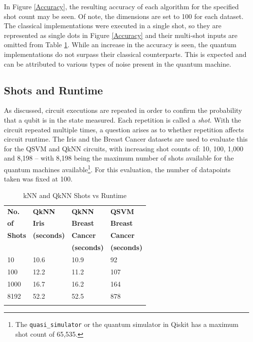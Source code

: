 In Figure \ref{Accuracy}, the resulting accuracy of each algorithm for the specified shot count may be seen. Of note, the dimensions are set to 100 for each dataset. The classical implementations were executed in a single shot, so they are represented as single dots in Figure \ref{Accuracy} and their multi-shot inputs are omitted from Table \ref{tab:treatments}. While an increase in the accuracy is seen, the quantum implementations do not surpass their classical counterparts. This is expected and can be attributed to various types of noise present in the quantum machine. 

\subsection{Shots and Runtime}
As discussed, circuit executions are repeated in order to confirm the probability that a qubit is in the state measured. Each repetition is called a \emph{shot}. With the circuit repeated multiple times, a question arises as to whether repetition affects circuit runtime. The Iris and the Breast Cancer datasets are used to evaluate this for the QSVM and QkNN circuits, with increasing shot counts of: 10, 100, 1,000 and 8,198 -- with 8,198 being the maximum number of shots available for the quantum machines available\footnote{The \texttt{quasi\_simulator} or the quantum simulator in Qiskit has a maximum shot count of 65,535.}. For this evaluation, the number of datapoints taken was fixed at 100.

\begin{table}
\caption{kNN and QkNN Shots vs Runtime}
\label{tab:treatments}
\centering
\begin{tabular}{l l l l }
\toprule
\textbf{No.} & \textbf{QkNN} & \textbf{QkNN} &  \textbf{QSVM} \\
\textbf{of} & \textbf{Iris} &  
\textbf{Breast} & \textbf{Breast}\\
\textbf{Shots} & \textbf{(seconds)} & \textbf{Cancer}& \textbf{Cancer}\\
\textbf{} & \textbf{} & \textbf{(seconds)}& \textbf{(seconds)}\\
\midrule
10 & 10.6 & 10.9 & 92  \\
100 & 12.2 & 11.2 & 107 \\
1000 & 16.7 & 16.2 & 164 \\
8192 & 52.2 & 52.5 & 878 \\
\bottomrule\\
\end{tabular}
\normalsize
\end{table}

